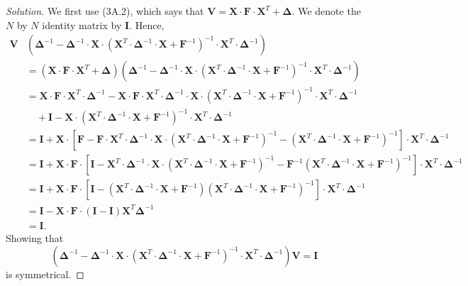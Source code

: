 \begin{proof}[Solution]
We first use (3A.2), which says that $\mathbf{V} = \mathbf{X} \cdot \mathbf{F} \cdot \mathbf{X}^{T} + \bm{\Delta}$. We denote the $N$ by $N$ identity matrix by $\mathbf{I}$. Hence,
\begin{align*}
\mathbf{V}&\left(\bm{\Delta}^{-1} - \bm{\Delta}^{-1} \cdot \mathbf{X} \cdot (\mathbf{X}^{T} \cdot \bm{\Delta}^{-1} \cdot \mathbf{X} + \mathbf{F}^{-1})^{-1} \cdot \mathbf{X}^{T} \cdot \bm{\Delta}^{-1}\right) \\ 
&= \left(\mathbf{X} \cdot \mathbf{F} \cdot \mathbf{X}^{T} + \bm{\Delta}\right)\left(\bm{\Delta}^{-1} - \bm{\Delta}^{-1} \cdot \mathbf{X} \cdot (\mathbf{X}^{T} \cdot \bm{\Delta}^{-1} \cdot \mathbf{X} + \mathbf{F}^{-1})^{-1} \cdot \mathbf{X}^{T} \cdot \bm{\Delta}^{-1}\right) \\
&= \mathbf{X} \cdot \mathbf{F} \cdot \mathbf{X}^{T} \cdot \bm{\Delta}^{-1} - \mathbf{X} \cdot \mathbf{F} \cdot \mathbf{X}^{T} \cdot \bm{\Delta}^{-1} \cdot \mathbf{X} \cdot  \left( \mathbf{X}^{T} \cdot \bm{\Delta}^{-1} \cdot \mathbf{X} + \mathbf{F}^{-1} \right)^{-1} \cdot \mathbf{X}^{T} \cdot \bm{\Delta}^{-1} \\
& \quad + \mathbf{I} - \mathbf{X} \cdot \left( \mathbf{X}^{T} \cdot \bm{\Delta}^{-1} \cdot \mathbf{X} + \mathbf{F}^{-1} \right)^{-1} \cdot \mathbf{X}^{T} \cdot \bm{\Delta}^{-1} \\
&= \mathbf{I} + \mathbf{X} \cdot \left[ \mathbf{F} - \mathbf{F} \cdot \mathbf{X}^{T} \cdot \bm{\Delta}^{-1} \cdot \mathbf{X} \cdot \left( \mathbf{X}^{T} \cdot \bm{\Delta}^{-1} \cdot \mathbf{X} + \mathbf{F}^{-1} \right)^{-1} - \left( \mathbf{X}^{T} \cdot \bm{\Delta}^{-1} \cdot \mathbf{X} + \mathbf{F}^{-1} \right)^{-1}  \right] \cdot \mathbf{X}^{T} \cdot \bm{\Delta}^{-1}\\
&= \mathbf{I} + \mathbf{X} \cdot \mathbf{F} \cdot \left[\mathbf{I} - \mathbf{X}^{T} \cdot \bm{\Delta}^{-1} \cdot \mathbf{X} \cdot \left( \mathbf{X}^{T} \cdot \bm{\Delta}^{-1} \cdot \mathbf{X} + \mathbf{F}^{-1} \right)^{-1} - \mathbf{F}^{-1} \left( \mathbf{X}^{T} \cdot \bm{\Delta}^{-1} \cdot \mathbf{X} + \mathbf{F}^{-1} \right)^{-1} \right] \cdot \mathbf{X}^{T} \cdot \bm{\Delta}^{-1}\\
&= \mathbf{I} + \mathbf{X} \cdot \mathbf{F} \cdot \left[\mathbf{I} - \left( \mathbf{X}^{T} \cdot \bm{\Delta}^{-1} \cdot \mathbf{X} + \mathbf{F}^{-1} \right)\left( \mathbf{X}^{T} \cdot \bm{\Delta}^{-1} \cdot \mathbf{X} + \mathbf{F}^{-1} \right)^{-1} \right] \cdot \mathbf{X}^{T} \cdot \bm{\Delta}^{-1}\\
&= \mathbf{I} - \mathbf{X} \cdot \mathbf{F} \cdot (\mathbf{I} - \mathbf{I})\mathbf{X}^{T}\bm{\Delta}^{-1}\\
&= \mathbf{I}.
\end{align*}
Showing that \[\left(\bm{\Delta}^{-1} - \bm{\Delta}^{-1} \cdot \mathbf{X} \cdot (\mathbf{X}^{T} \cdot \bm{\Delta}^{-1} \cdot \mathbf{X} + \mathbf{F}^{-1})^{-1} \cdot \mathbf{X}^{T} \cdot \bm{\Delta}^{-1}\right)\mathbf{V} = \mathbf{I}\] is symmetrical.
\end{proof}

